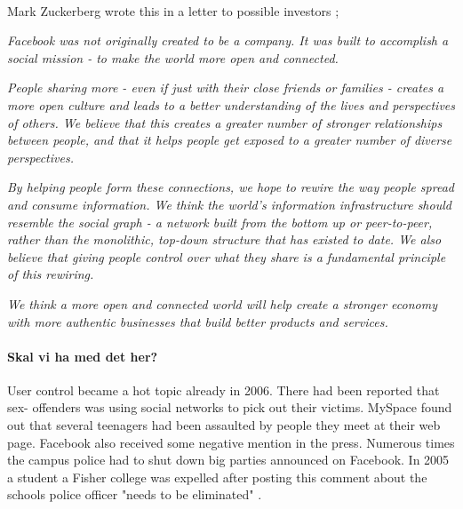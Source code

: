 \paragraph{}






\paragraph{}
Mark Zuckerberg wrote this in a letter to possible investors \cite{LetterToInvestors};

\textit{Facebook was not originally created to be a company. It was built to accomplish a social mission - to make the world more open and connected.}

\textit{People sharing more - even if just with their close friends or families - creates a more open culture and leads to a better understanding of the lives and perspectives of others. We believe that this creates a greater number of stronger relationships between people, and that it helps people get exposed to a greater number of diverse perspectives.}

\textit{By helping people form these connections, we hope to rewire the way people spread and consume information. We think the world's information infrastructure should resemble the social graph - a network built from the bottom up or peer-to-peer, rather than the monolithic, top-down structure that has existed to date. We also believe that giving people control over what they share is a fundamental principle of this rewiring.}

\textit{We think a more open and connected world will help create a stronger economy with more authentic businesses that build better products and services.}

\paragraph{Skal vi ha med det her?}
User control became a hot topic already in 2006. There had been reported that sex- offenders was using social networks to pick out their victims. MySpace found out that several teenagers had been assaulted by people they meet at their web page. Facebook also received some negative mention in the press. Numerous times the campus police had to shut down big parties announced on Facebook. In 2005 a student a Fisher college was expelled after posting this comment about the schools police officer "needs to be eliminated" \cite{MeMedia}.
